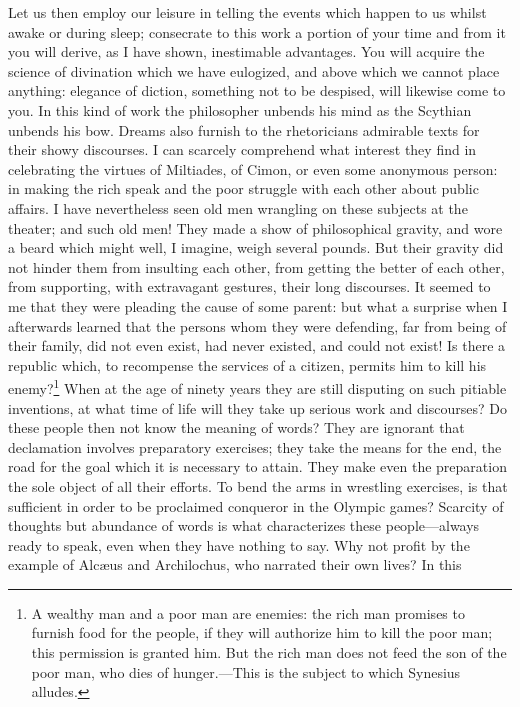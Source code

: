 \documentclass[12pt]{article}
\begin{document}
Let us then employ our leisure in telling the events which happen to us whilst
awake or during sleep; consecrate to this work a portion of your time and from
it you will derive, as I have shown, inestimable advantages. You will acquire
the science of divination which we have eulogized, and above which we cannot
place anything: elegance of diction, something not to be despised, will
likewise come to you. In this kind of work the philosopher unbends his mind as
the Scythian unbends his bow. Dreams also furnish to the rhetoricians admirable
texts for their showy discourses. I can scarcely comprehend what interest they
find in celebrating the virtues of Miltiades, of Cimon, or even some anonymous
person: in making the rich speak and the poor struggle with each other about
public affairs. I have nevertheless seen old men wrangling on these subjects at
the theater; and such old men! They made a show of philosophical gravity, and
wore a beard which might well, I imagine, weigh several pounds. But their
gravity did not hinder them from insulting each other, from getting the better
of each other, from supporting, with extravagant gestures, their long
discourses. It seemed to me that they were pleading the cause of some parent:
but what a surprise when I afterwards learned that the persons whom they were
defending, far from being of their family, did not even exist, had never
existed, and could not exist! Is there a republic which, to recompense the
services of a citizen, permits him to kill his enemy?\footnote{A wealthy man
and a poor man are enemies: the rich man promises to furnish food for the
people, if they will authorize him to kill the poor man; this permission is
granted him. But the rich man does not feed the son of the poor man, who dies
of hunger.---This is the subject to which Synesius alludes.} When at the age of
ninety years they are still disputing on such pitiable inventions, at what time
of life will they take up serious work and discourses? Do these people then not
know the meaning of words? They are ignorant that declamation involves
preparatory exercises; they take the means for the end, the road for the goal
which it is necessary to attain. They make even the preparation the sole object
of all their efforts. To bend the arms in wrestling exercises, is that
sufficient in order to be proclaimed conqueror in the Olympic games? Scarcity
of thoughts but abundance of words is what characterizes these people---always
ready to speak, even when they have nothing to say. Why not profit by the
example of Alc{\ae}us and Archilochus, who narrated their own lives? In this
\end{document}
